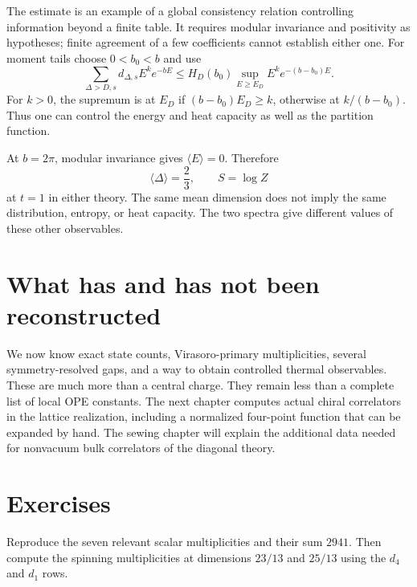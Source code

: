 The estimate is an example of a global consistency relation
controlling information beyond a finite table. It requires
modular invariance and positivity as hypotheses; finite agreement
of a few coefficients cannot establish either one.
For moment tails choose $0<b_0<b$ and use
\begin{equation}
 \sum_{\Delta>D,s}d_{\Delta,s}E^ke^{-bE}
 \le H_D(b_0)\sup_{E\ge E_D}E^ke^{-(b-b_0)E}.
 \label{eq:full-moment-tail}
\end{equation}
For $k>0$, the supremum is at $E_D$ if
$(b-b_0)E_D\ge k$, otherwise at $k/(b-b_0)$.
Thus one can control the energy and heat capacity as well as
the partition function.

\begin{example}
At $b=2\pi$, modular invariance gives
$\langle E\rangle=0$. Therefore
\[
 \langle\Delta\rangle=\frac23,
 \qquad S=\log Z
\]
at $t=1$ in either theory. The same mean dimension does not imply
the same distribution, entropy, or heat capacity. The two spectra
give different values of these other observables.
\end{example}

\section{What has and has not been reconstructed}

We now know exact state counts, Virasoro-primary multiplicities,
several symmetry-resolved gaps, and a way to obtain controlled
thermal observables. These are much more than a central charge.
They remain less than a complete list of local OPE constants.
The next chapter computes actual chiral correlators in the lattice
realization, including a normalized four-point function that can
be expanded by hand. The sewing chapter will explain the additional
data needed for nonvacuum bulk correlators of the diagonal theory.

\section{Exercises}

\begin{exercise}\label{ex:full-relevant}
Reproduce the seven relevant scalar multiplicities and their sum
$2941$. Then compute the spinning multiplicities at dimensions
$23/13$ and $25/13$ using the $d_4$ and $d_1$ rows.

\par\smallskip{}\par
\end{exercise}

